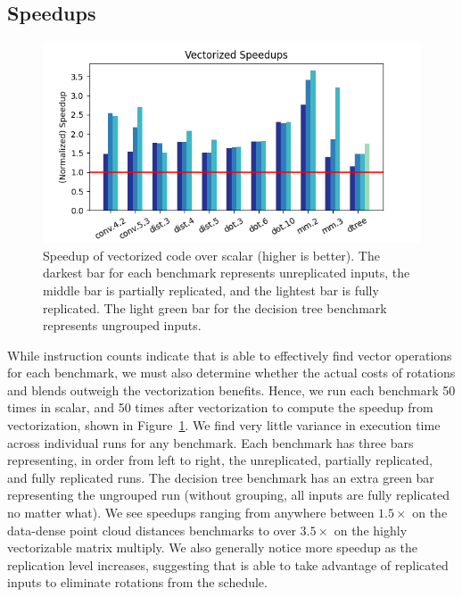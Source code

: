 \subsection{Speedups}\label{sec:speedups}

\begin{figure}[t]
	\centering
    \includegraphics[width=0.9\linewidth]{figures/graphs/vector_speedups.png}
    \caption{Speedup of vectorized code over scalar (higher is better). The darkest bar for each benchmark represents unreplicated inputs, the middle bar is partially replicated, and the lightest bar is fully replicated. The light green bar for the decision tree benchmark represents ungrouped inputs.}\label{fig:vector-speedups}
\end{figure}

While instruction counts indicate that \system is able to effectively find vector operations for each benchmark, we must also determine whether the actual costs of rotations and blends outweigh the vectorization benefits. Hence, we run each benchmark 50 times in scalar, and 50 times after vectorization to compute the speedup from vectorization, shown in Figure~\ref{fig:vector-speedups}.
We find very little variance in execution time across individual runs for any benchmark.
Each benchmark has three bars representing, in order from left to right, the unreplicated, partially replicated, and fully replicated runs. 
The decision tree benchmark has an extra green bar representing the ungrouped run (without grouping, all inputs are fully replicated no matter what).
We see speedups ranging from anywhere between $1.5\times$ on the data-dense point cloud distances benchmarks to over $3.5\times$ on the highly vectorizable matrix multiply.
We also generally notice more speedup as the replication level increases, suggesting that \system is able to take advantage of replicated inputs to eliminate rotations from the schedule.

